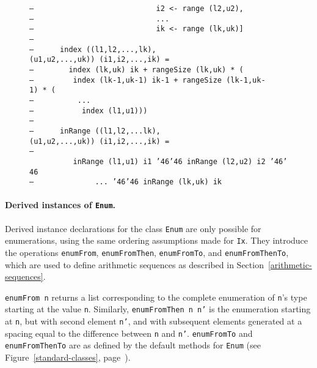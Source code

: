 \begin{figure}
{\mbox{\tt --\ \ \ \ \ \ \ \ \ \ \ \ \ \ \ \ \ \ \ \ \ \ \ \ \ \ \ \ i2\ <-\ range\ (l2,u2),}\\
\mbox{\tt --\ \ \ \ \ \ \ \ \ \ \ \ \ \ \ \ \ \ \ \ \ \ \ \ \ \ \ \ ...}\\
\mbox{\tt --\ \ \ \ \ \ \ \ \ \ \ \ \ \ \ \ \ \ \ \ \ \ \ \ \ \ \ \ ik\ <-\ range\ (lk,uk)]}\\
\mbox{\tt --}\\
\mbox{\tt --\ \ \ \ \ \ index\ ((l1,l2,...,lk),(u1,u2,...,uk))\ (i1,i2,...,ik)\ =}\\
\mbox{\tt --\ \ \ \ \ \ \ \ index\ (lk,uk)\ ik\ +\ rangeSize\ (lk,uk)\ *\ (}\\
\mbox{\tt --\ \ \ \ \ \ \ \ \ index\ (lk-1,uk-1)\ ik-1\ +\ rangeSize\ (lk-1,uk-1)\ *\ (}\\
\mbox{\tt --\ \ \ \ \ \ \ \ \ \ ...}\\
\mbox{\tt --\ \ \ \ \ \ \ \ \ \ \ index\ (l1,u1)))}\\
\mbox{\tt --}\\
\mbox{\tt --\ \ \ \ \ \ inRange\ ((l1,l2,...lk),(u1,u2,...,uk))\ (i1,i2,...,ik)\ =}\\
\mbox{\tt --\ \ \ \ \ \ \ \ \ \ inRange\ (l1,u1)\ i1\ {\char'46}{\char'46}\ inRange\ (l2,u2)\ i2\ {\char'46}{\char'46}}\\
\mbox{\tt --\ \ \ \ \ \ \ \ \ \ \ \ \ \ ...\ {\char'46}{\char'46}\ inRange\ (lk,uk)\ ik}
}
\label{prelude-index}
\end{figure}

\paragraph*{Derived instances of \mbox{\tt Enum}.}
Derived instance declarations for the class \mbox{\tt Enum} are only
possible for enumerations, using the same ordering assumptions made
for \mbox{\tt Ix}.  They introduce the operations
\mbox{\tt enumFrom},
\mbox{\tt enumFromThen}, \mbox{\tt enumFromTo}, and
\mbox{\tt enumFromThenTo},
which are used to define arithmetic sequences as described
in Section~\ref{arithmetic-sequences}.

\mbox{\tt enumFrom\ n} returns a list corresponding to the complete enumeration
of \mbox{\tt n}'s type starting at the value \mbox{\tt n}.
Similarly, \mbox{\tt enumFromThen\ n\ n'} is the enumeration starting at \mbox{\tt n}, but
with second element \mbox{\tt n'}, and with subsequent elements generated at a
spacing equal to the difference between \mbox{\tt n} and \mbox{\tt n'}.
\mbox{\tt enumFromTo} and \mbox{\tt enumFromThenTo} are as defined by the
default methods
for \mbox{\tt Enum} (see Figure~\ref{standard-classes},
page~\pageref{standard-classes}).

